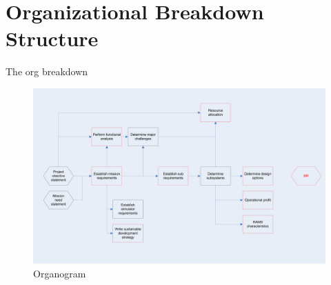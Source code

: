 \section{Organizational Breakdown Structure}
\label{dsePPOBS}
The org breakdown

\newpage
\begin{figure}
\begin{center}
\includegraphics[width=1.2\textwidth]{chapters/img/Workflow_diagram_BR.jpg}
\end{center}
\caption{Organogram}
\end{figure}